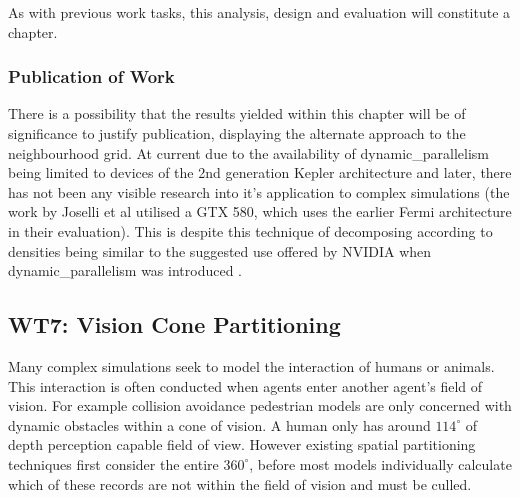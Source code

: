         As with previous work tasks, this analysis, design and evaluation will constitute a chapter.
        
      \subsubsection*{Publication of Work}
        There is a possibility that the results yielded within this chapter will be of significance to justify publication, displaying the alternate approach to the neighbourhood grid. At current due to the availability of \gls{dynamic_parallelism} being limited to devices of the 2nd generation Kepler architecture and later, there has not been any visible research into it's application to complex simulations (the work by Joselli et al utilised a GTX 580, which uses the earlier Fermi architecture in their evaluation). This is despite this technique of decomposing according to densities being similar to the suggested use offered by NVIDIA when \gls{dynamic_parallelism} was introduced \cite{NV_DP}.
            
    \subsection{WT7: Vision Cone Partitioning}
      Many complex simulations seek to model the interaction of humans or animals. This interaction is often conducted when agents enter another agent's field of vision. For example collision avoidance pedestrian models are only concerned with dynamic obstacles within a cone of vision. A human only has around $114^{\circ}$ of depth perception capable field of view. However existing spatial partitioning techniques first consider the entire $360^{\circ}$, before most models individually calculate which of these records are not within the field of vision and must be culled.
      
